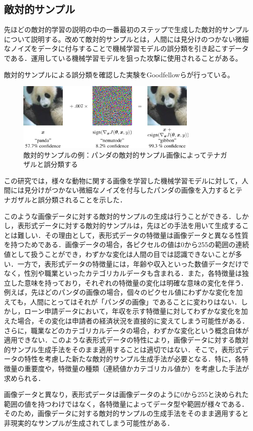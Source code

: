 \subsection{敵対的サンプル}
先ほどの敵対的学習の説明の中の一番最初のステップで生成した敵対的サンプルについて説明する。改めて敵対的サンプルとは，人間には見分けのつかない微細なノイズをデータに付与することで機械学習モデルの誤分類を引き起こすデータである．運用している機械学習モデルを狙った攻撃に使用されることがある。

敵対的サンプルによる誤分類を確認した実験をGoodfellowらが行っている\cite{goodfellow2015explaining}。
\begin{figure}[h]
    \centering
    \includegraphics[width=0.8\textwidth]{images/goodfellow_panda.png}
    \caption{敵対的サンプルの例：パンダの敵対的サンプル画像によってテナガザルと誤分類する}
    \label{fig:adversarial_example}
\end{figure}

この研究では，様々な動物に関する画像を学習した機械学習モデルに対して，人間には見分けがつかない微細なノイズを付与したパンダの画像を入力するとテナガザルと誤分類されることを示した．

このような画像データに対する敵対的サンプルの生成は行うことができる．しかし，表形式データに対する敵対的サンプルは，先ほどの手法を用いて生成することは難しい．その理由として，表形式データの特徴量は画像データと異なる性質を持つためである．画像データの場合，各ピクセルの値は0から255の範囲の連続値として扱うことができ，わずかな変化は人間の目では認識できないことが多い．一方で，表形式データの特徴量には，年齢や収入といった数値データだけでなく，性別や職業といったカテゴリカルデータも含まれる．また，各特徴量は独立した意味を持っており，それぞれの特徴量の変化は明確な意味の変化を伴う．例えば，先ほどのパンダの画像の場合，個々のピクセル値にわずかな変化を加えても，人間にとってはそれが「パンダの画像」であることに変わりはない．しかし，ローン申請データにおいて，年収を示す特徴量に対してわずかな変化を加えた場合，その変化は申請者の経済状況を直接的に変えてしまう可能性がある．さらに，職業などのカテゴリカルデータの場合，わずかな変化という概念自体が適用できない．このような表形式データの特性により，画像データに対する敵対的サンプル生成手法をそのまま適用することは適切ではない．そこで，表形式データの特性を考慮した新たな敵対的サンプル生成手法が必要となる．特に，各特徴量の重要度や，特徴量の種類（連続値かカテゴリカル値か）を考慮した手法が求められる．



画像データと異なり，表形式データは画像データのように0から255と決められた範囲の値を持つわけではなく，各特徴量によってデータ型や範囲が様々である．そのため，画像データに対する敵対的サンプルの生成手法をそのまま適用すると非現実的なサンプルが生成されてしまう可能性がある．